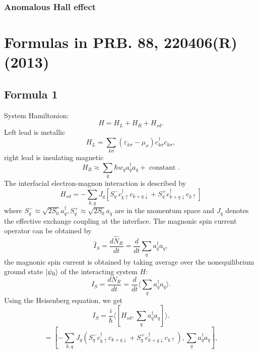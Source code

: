 \documentclass[11pt,a4paper]{article}
\begin{document}
\subsubsection{Anomalous Hall effect}
\section{Formulas in PRB. 88, 220406(R) (2013)}
\subsection{Formula 1}
System Hamiltonion:
\begin{equation}
H=H_{L}+H_{R}+H_{s d}.
\end{equation}
Left lead is metallic
\begin{equation}
H_{L} = \sum_{k\sigma} \left(\varepsilon_{k\sigma}-\mu_{\sigma}\right) c_{k \sigma}^{\dagger} c_{k \sigma},
\end{equation}
right lead is insulating magnetic
\begin{equation}
H_{R} \approx \sum_{q} \hbar w_{q} a_{q}^{\dagger} a_{q}+\text { constant }.
\end{equation}
The interfacial electron-magnon interaction is described by
\begin{equation}
H_{s d}=-\sum_{k, q} J_{q}\left[S_{q}^{-} c_{k \uparrow}^{\dagger} c_{k+q \downarrow}+S_{q}^{+} c_{k+q \downarrow}^{\dagger} c_{k \uparrow}\right]
\end{equation}
where $S_{q}^{-} \approx \sqrt{2 S_{0}} a_{q}^{\dagger}, S_{q}^{+} \approx \sqrt{2 S_{0}} a_{q}$ are in the momentum space and $J_{q}$ denotes the effective exchange coupling at the interface. The magnonic spin current operator can be obtained by
\begin{equation}
\hat{I}_{S} = \frac{d\hat{N}_{R}}{dt} =  \frac{d}{dt} \sum_{q}a_{q}^{\dag}a_{q},
\end{equation}
the magnonic spin current is obtained by taking average over the nonequilibrium ground state $\ket{\psi_{0}}$ of the interacting system $H$:
\begin{equation}
I_{S} = \frac{dN_{R}}{dt} =  \frac{d}{dt} \langle \sum_{q}a_{q}^{\dag}a_{q}\rangle.
\end{equation}
Using the Heisenberg equation, we get
\begin{equation}
I_{S}=\frac{i}{\hbar}\langle[H_{s d}, \sum_{q} a_{q}^{\dagger} a_{q}]\rangle.
\end{equation}
\begin{equation}
[H_{s d}, \sum_{q} a_{q}^{\dagger} a_{q}] = [-\sum_{k, q} J_{q}\left(S_{q}^{-} c_{k \uparrow}^{\dagger} c_{k+q \downarrow}+S_{q}^{+} c_{k+q \downarrow}^{\dagger} c_{k \uparrow}\right), \sum_{q} a_{q}^{\dagger} a_{q}],
\end{equation}
\end{document}

